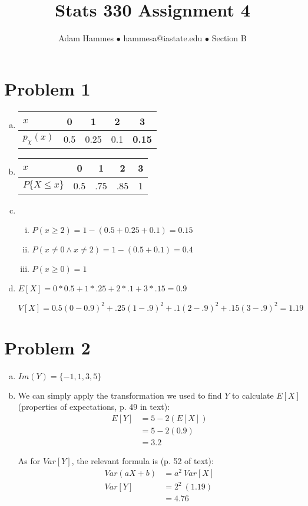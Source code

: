 \documentclass[11pt]{article}
\begin{document}
\title{Stats 330 Assignment 4}
\author{Adam Hammes $\bullet$ hammesa@iastate.edu $\bullet$ Section B}
\maketitle

\section*{Problem 1}
\begin{enumerate}[(a)]
	\item
	\begin{tabular}{l| c c c c|}
		$x$ & 0 & 1 & 2 & 3 \\
		\hline
		$p_{\chi}(x)$ & 0.5 & 0.25 & 0.1 & \textbf{0.15}\\
	\end{tabular}
	
	\item
	\begin{tabular}{l| c c c c|}
		$x$ & 0 & 1 & 2 & 3\\
		\hline
		$P\{X \leq x\}$ & 0.5 & .75 &.85 & 1\\
	\end{tabular}
	\item
	\begin{enumerate}[i.]
		\item $P ( x \ge 2) = 1 - (0.5 + 0.25 + 0.1 ) = 0.15$
	
		\item $P ( x \neq 0 \wedge x \neq 2 ) = 1 - (0.5 + 0.1 ) = 0.4$
	
		\item $P ( x \ge 0 ) = 1$
	\end{enumerate}
	\item	
	$E[X] = 0 * 0.5 + 1 * .25 + 2 * .1 + 3 * .15 = 0.9$
		
	$V[X] = 0.5(0 - 0.9)^2 + .25(1-.9)^2+ .1(2-.9)^2  + .15(3-.9)^2 = 1.19$

\end{enumerate}


\section*{Problem 2}
\begin{enumerate}[(a)]
	\item $Im(Y) = \{-1, 1, 3, 5\}$
	
	\item We can simply apply the transformation we used to find $Y$ to calculate $E[X]$ (properties of expectations, p. 49 in text):
		\begin{align*}
		E[Y] &= 5 - 2( E[X] ) \\
		&= 5 - 2( 0.9 ) \\
		&= 3.2
		\end{align*}
		
		As for $Var[Y]$, the relevant formula is (p. 52 of text):
		\begin{align*}
			Var(aX + b) &= a^2\ Var[X] \\
			Var[Y] &= 2^2\ (1.19) \\
			&= 4.76
		\end{align*}
\end{enumerate}
		
\end{document}
